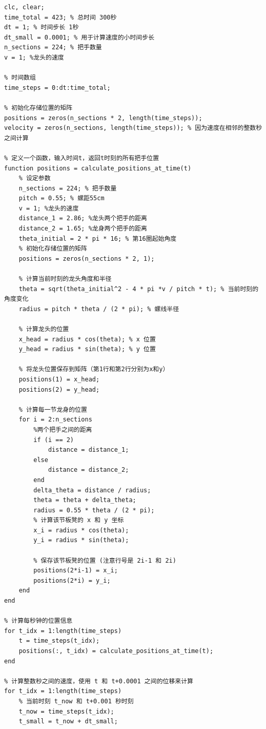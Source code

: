 \documentclass{cumcmthesis1}
\begin{document}
\begin{lstlisting}[caption={计算问题1的代码并将计算结果写入到result1.xlsx中}, label={lst:first_code}]
clc, clear;
time_total = 423; % 总时间 300秒
dt = 1; % 时间步长 1秒
dt_small = 0.0001; % 用于计算速度的小时间步长
n_sections = 224; % 把手数量
v = 1; %龙头的速度

% 时间数组
time_steps = 0:dt:time_total;

% 初始化存储位置的矩阵
positions = zeros(n_sections * 2, length(time_steps)); 
velocity = zeros(n_sections, length(time_steps)); % 因为速度在相邻的整数秒之间计算

% 定义一个函数，输入时间t，返回t时刻的所有把手位置
function positions = calculate_positions_at_time(t)
    % 设定参数
    n_sections = 224; % 把手数量
    pitch = 0.55; % 螺距55cm
    v = 1; %龙头的速度
    distance_1 = 2.86; %龙头两个把手的距离
    distance_2 = 1.65; %龙身两个把手的距离
    theta_initial = 2 * pi * 16; % 第16圈起始角度
    % 初始化存储位置的矩阵
    positions = zeros(n_sections * 2, 1);
    
    % 计算当前时刻的龙头角度和半径
    theta = sqrt(theta_initial^2 - 4 * pi *v / pitch * t); % 当前时刻的角度变化
    radius = pitch * theta / (2 * pi); % 螺线半径
    
    % 计算龙头的位置
    x_head = radius * cos(theta); % x 位置
    y_head = radius * sin(theta); % y 位置
    
    % 将龙头位置保存到矩阵（第1行和第2行分别为x和y）
    positions(1) = x_head;
    positions(2) = y_head;
    
    % 计算每一节龙身的位置
    for i = 2:n_sections
        %两个把手之间的距离
        if (i == 2)
            distance = distance_1;
        else
            distance = distance_2;
        end
        delta_theta = distance / radius;
        theta = theta + delta_theta;
        radius = 0.55 * theta / (2 * pi);
        % 计算该节板凳的 x 和 y 坐标
        x_i = radius * cos(theta);
        y_i = radius * sin(theta);
        
        % 保存该节板凳的位置 (注意行号是 2i-1 和 2i)
        positions(2*i-1) = x_i;
        positions(2*i) = y_i;
    end
end

% 计算每秒钟的位置信息
for t_idx = 1:length(time_steps)
    t = time_steps(t_idx);
    positions(:, t_idx) = calculate_positions_at_time(t);
end

% 计算整数秒之间的速度，使用 t 和 t+0.0001 之间的位移来计算
for t_idx = 1:length(time_steps)
    % 当前时刻 t_now 和 t+0.001 秒时刻
    t_now = time_steps(t_idx);
    t_small = t_now + dt_small;
    

\end{lstlisting}
\end{document}
